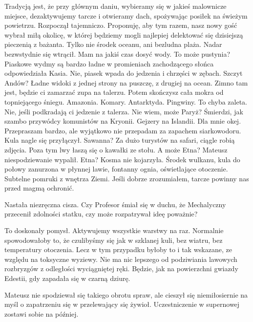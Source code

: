 \begin{dialogue}
\ds{} Tradycją jest, że przy głównym daniu, wybieramy się w jakieś malownicze miejsce, dezaktywujemy tarcze i otwieramy dach, spożywając posiłek na świeżym powietrzu. \dm{}
Rozpoczął tajemniczo. \dm{} Proponuję, aby tym razem, nasz nowy gość wybrał miłą okolicę, w której będziemy mogli najlepiej delektować się dzisiejszą pieczenią z bażanta.
\ds{} Tylko nie środek oceanu, ani bezludna plaża. \dm{} Nadar bezwstydnie się wtrącił. \dm{} Mam na jakiś czas dosyć wody. 
\ds{} To może pustynia? Piaskowe wydmy są bardzo ładne w promieniach zachodzącego słońca \dm{} odpowiedziała Kasia. \de{}
\ds{} Nie, piasek wpada do jedzenia i chrzęści w zębach.
\ds{} Szczyt Andów? Ładne widoki z jednej strony na puszczę, z drugiej na ocean.
\ds{} Zimno tam jest, będzie ci zamarzać zupa na talerzu. Potem skończysz cała mokra od topniejącego śniegu.
\ds{} Amazonia.
\ds{} Komary.
\ds{} Antarktyda.
\ds{} Pingwiny.
\ds{} To chyba zaleta.
\ds{} Nie, jeśli podkradają ci jedzenie z talerza.
\ds{} Nie wiem, może Paryż?
\ds{} Śmierdzi, jak szambo przywódcy komunistów na Kryonii.
\ds{} Gejzery na Islandii.
\ds{} Dla mnie okej.
\ds{} Przepraszam bardzo, ale wyjątkowo nie przepadam za zapachem siarkowodoru. \dm{} Kula nagle się przyłączył.
\ds{} Sawanna?
\ds{} Za dużo turystów na safari, ciągle robią zdjęcia. Poza tym lwy łaszą się o kawałki ze stołu.
\ds{} A może Etna? \dm{} Mateusz niespodziewanie wypalił.
\ds{} Etna? \dm{} Kosma nie kojarzyła.
\ds{} Środek wulkanu, kula do połowy zanurzona w płynnej lawie, fontanny ognia, oświetlające otoczenie. Subtelne pomruki z wnętrza Ziemi.
Jeśli dobrze zrozumiałem, tarcze powinny nas przed magmą ochronić.
\end{dialogue}

Nastała niezręczna cisza. Czy Profesor śmiał się w duchu, że Mechalyczny przecenił zdolności statku, czy może rozpatrywał ideę poważnie?

\begin{dialogue}
\ds{} To doskonały pomysł. Aktywujemy wszystkie warstwy na raz. Normalnie spowodowałoby to, że czulibyśmy się 
jak w szklanej kuli, bez wiatru, bez temperatury otoczenia. Lecz w tym przypadku byłoby to i tak wskazane, ze względu na toksyczne wyziewy.
Nie ma nic lepszego od podziwiania lawowych rozbryzgów z odległości wyciągniętej ręki. Będzie, jak na powierzchni gwiazdy Edestii, gdy zapadała się w czarną dziurę.
\end{dialogue}

Mateusz nie spodziewał się takiego obrotu spraw, ale cieszył się niemiłosiernie na myśl o zapatrzeniu się w przelewający się żywioł.
Uczestniczenie w supernowej zostawi sobie na później.

